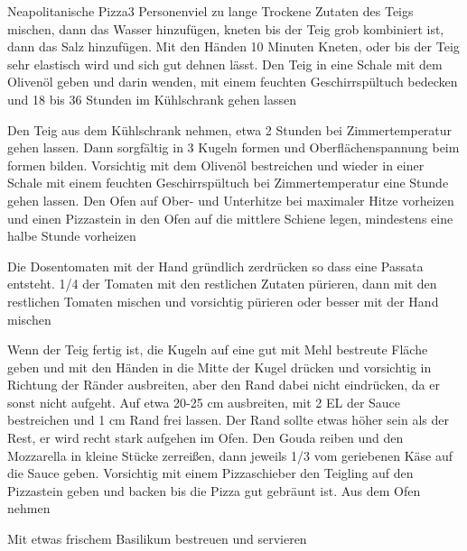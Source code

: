 \begin{recipe}{Neapolitanische Pizza}{3 Personen}{viel zu lange}
Trockene Zutaten des Teigs mischen, dann das Wasser hinzufügen, kneten bis der Teig grob kombiniert ist, dann das Salz hinzufügen. Mit den Händen 10 Minuten Kneten, oder bis der Teig sehr elastisch wird und sich gut dehnen lässt. 
Den Teig in eine Schale mit dem Olivenöl geben und darin wenden, mit einem feuchten Geschirrspültuch bedecken und 18 bis 36 Stunden im Kühlschrank gehen lassen

Den Teig aus dem Kühlschrank nehmen, etwa 2 Stunden bei Zimmertemperatur gehen lassen. Dann sorgfältig in 3 Kugeln formen und Oberflächenspannung beim formen bilden. Vorsichtig mit dem Olivenöl bestreichen und wieder in einer Schale mit einem feuchten Geschirrspültuch bei Zimmertemperatur eine Stunde gehen lassen.
Den Ofen auf Ober- und Unterhitze bei maximaler Hitze vorheizen und einen Pizzastein in den Ofen auf die mittlere Schiene legen, mindestens eine halbe Stunde vorheizen

Die Dosentomaten mit der Hand gründlich zerdrücken so dass eine Passata entsteht.
1/4 der Tomaten mit den restlichen Zutaten pürieren, dann mit den restlichen Tomaten mischen und vorsichtig pürieren oder besser mit der Hand mischen

Wenn der Teig fertig ist, die Kugeln auf eine gut mit Mehl bestreute Fläche geben und mit den Händen in die Mitte der Kugel drücken und vorsichtig in Richtung der Ränder ausbreiten, aber den Rand dabei nicht eindrücken, da er sonst nicht aufgeht. 
Auf etwa 20-25 cm ausbreiten, mit 2 EL der Sauce bestreichen und 1 cm Rand frei lassen. Der Rand sollte etwas höher sein als der Rest, er wird recht stark aufgehen im Ofen.
Den Gouda reiben und den Mozzarella in kleine Stücke zerreißen, dann jeweils 1/3 vom geriebenen Käse auf die Sauce geben.
Vorsichtig mit einem Pizzaschieber den Teigling auf den Pizzastein geben und backen bis die Pizza gut gebräunt ist. Aus dem Ofen nehmen 

Mit etwas frischem Basilikum bestreuen und servieren
\end{recipe}


